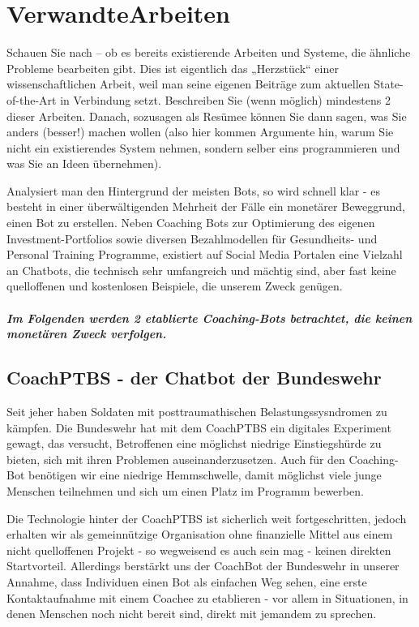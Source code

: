 \chapter{VerwandteArbeiten}

Schauen Sie nach – ob es bereits existierende Arbeiten und Systeme, die ähnliche Probleme bearbeiten gibt. Dies ist eigentlich das „Herzstück“ einer wissenschaftlichen Arbeit, weil man seine eigenen Beiträge zum aktuellen State-of-the-Art in  
Verbindung setzt.  
Beschreiben Sie (wenn möglich) mindestens 2 dieser Arbeiten. Danach, sozusagen als Resümee können Sie dann sagen, was Sie anders (besser!) machen wollen (also hier kommen Argumente hin, warum Sie nicht ein existierendes System nehmen, sondern selber eins programmieren und was Sie an Ideen übernehmen).  

Analysiert man den Hintergrund der meisten Bots, so wird schnell klar - es besteht in einer überwältigenden Mehrheit der Fälle ein monetärer Beweggrund, einen Bot zu erstellen. Neben Coaching Bots zur Optimierung des eigenen Investment-Portfolios sowie diversen Bezahlmodellen für Gesundheits- und Personal Training Programme, existiert auf Social Media Portalen eine Vielzahl an Chatbots, die technisch sehr umfangreich und mächtig sind, aber fast keine quelloffenen und kostenlosen Beispiele, die unserem Zweck genügen.
\paragraph{Im Folgenden werden 2 etablierte Coaching-Bots betrachtet, die keinen monetären Zweck verfolgen.}

\section{CoachPTBS - der Chatbot der Bundeswehr}
Seit jeher haben Soldaten mit posttraumathischen Belastungssysndromen zu kämpfen. Die Bundeswehr hat mit dem CoachPTBS ein digitales Experiment gewagt, das versucht, Betroffenen eine möglichst niedrige Einstiegshürde zu bieten, sich mit ihren Problemen auseinanderzusetzen. Auch für den Coaching-Bot benötigen wir eine niedrige Hemmschwelle, damit möglichst viele junge Menschen teilnehmen und sich um einen Platz im Programm bewerben.


Die Technologie hinter der CoachPTBS ist sicherlich weit fortgeschritten, jedoch erhalten wir als gemeinnützige Organisation ohne finanzielle Mittel aus einem nicht quelloffenen Projekt - so wegweisend es auch sein mag - keinen direkten Startvorteil. Allerdings berstärkt uns der CoachBot der Bundeswehr in unserer Annahme, dass Individuen einen Bot als einfachen Weg sehen, eine erste Kontaktaufnahme mit einem Coachee zu etablieren - vor allem in Situationen, in denen Menschen noch nicht bereit sind, direkt mit jemandem zu sprechen.



